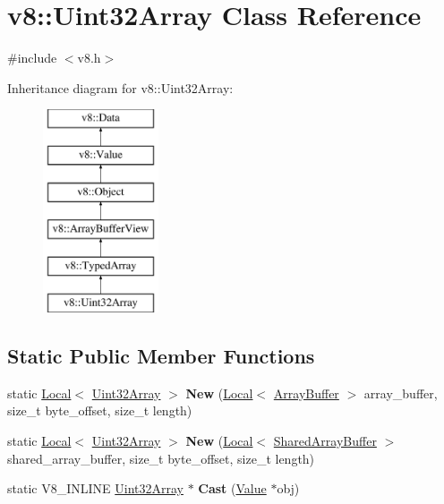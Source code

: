 \hypertarget{classv8_1_1Uint32Array}{}\section{v8\+:\+:Uint32\+Array Class Reference}
\label{classv8_1_1Uint32Array}


{\ttfamily \#include $<$v8.\+h$>$}

Inheritance diagram for v8\+:\+:Uint32\+Array\+:\begin{figure}[H]
\begin{center}
\leavevmode
\includegraphics[height=6.000000cm]{classv8_1_1Uint32Array}
\end{center}
\end{figure}
\subsection*{Static Public Member Functions}
\begin{DoxyCompactItemize}
\item 
static \hyperlink{classv8_1_1Local}{Local}$<$ \hyperlink{classv8_1_1Uint32Array}{Uint32\+Array} $>$ {\bfseries New} (\hyperlink{classv8_1_1Local}{Local}$<$ \hyperlink{classv8_1_1ArrayBuffer}{Array\+Buffer} $>$ array\+\_\+buffer, size\+\_\+t byte\+\_\+offset, size\+\_\+t length)\hypertarget{classv8_1_1Uint32Array_ab8dbef5ff846fc6cc9381bc29f744b5b}{}\label{classv8_1_1Uint32Array_ab8dbef5ff846fc6cc9381bc29f744b5b}

\item 
static \hyperlink{classv8_1_1Local}{Local}$<$ \hyperlink{classv8_1_1Uint32Array}{Uint32\+Array} $>$ {\bfseries New} (\hyperlink{classv8_1_1Local}{Local}$<$ \hyperlink{classv8_1_1SharedArrayBuffer}{Shared\+Array\+Buffer} $>$ shared\+\_\+array\+\_\+buffer, size\+\_\+t byte\+\_\+offset, size\+\_\+t length)\hypertarget{classv8_1_1Uint32Array_a03da1a9371316818a926d2b8231ac33a}{}\label{classv8_1_1Uint32Array_a03da1a9371316818a926d2b8231ac33a}

\item 
static V8\+\_\+\+I\+N\+L\+I\+NE \hyperlink{classv8_1_1Uint32Array}{Uint32\+Array} $\ast$ {\bfseries Cast} (\hyperlink{classv8_1_1Value}{Value} $\ast$obj)\hypertarget{classv8_1_1Uint32Array_ad40e645ee0abac443dba759ee861de49}{}\label{classv8_1_1Uint32Array_ad40e645ee0abac443dba759ee861de49}

\end{DoxyCompactItemize}
